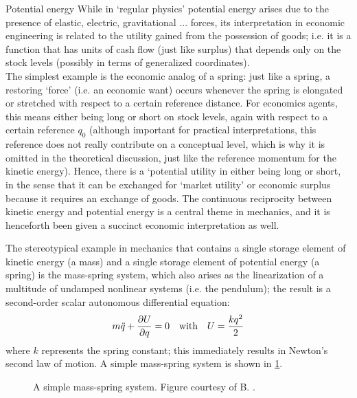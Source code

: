 \begin{econ}{Potential energy}
    While in `regular physics' potential energy arises due to the presence of elastic, electric, gravitational ... forces, its interpretation in economic engineering is related to the utility gained from the possession of goods; i.e. it is a function that has units of cash flow (just like surplus) that depends only on the stock levels (possibly in terms of generalized coordinates).\\

    The simplest example is the economic analog of a spring: just like a spring, a restoring `force' (i.e. an economic want) occurs whenever the spring is elongated or stretched with respect to a certain reference distance. For economics agents, this means either being long or short on stock levels, again with respect to a certain reference $q_0$ (although important for practical interpretations, this reference does not really contribute on a conceptual level, which is why it is omitted in the theoretical discussion, just like the reference momentum for the kinetic energy). Hence, there is a `potential utility in either being long or short, in the sense that it can be exchanged for `market utility' or economic surplus because it requires an exchange of goods. The continuous reciprocity between kinetic energy and 
    potential energy is a central theme in mechanics, and it is henceforth been given a succinct economic interpretation as well.
\end{econ}
The stereotypical example in mechanics that contains a single storage element of kinetic energy (a mass) and a single storage  element of potential energy (a spring) is the mass-spring system, which also arises as the linearization of a multitude of undamped nonlinear systems (i.e. the pendulum); the result is a second-order scalar autonomous differential equation:
\begin{equation}
    m\ddot{q} + \pdv{U}{q} = 0 \quad \text{with} \quad U = \frac{kq^2}{2}
    \label{eq:mass_spring}
\end{equation}
where $k$ represents the spring constant; this immediately results in Newton's second law of motion. A simple mass-spring system is shown in \cref{fig:mass_spring}.
\begin{figure}[ht]
    \centering
    
    \caption{A simple mass-spring system. Figure courtesy of B. \citet{Krabbenborg2021}.}
    \label{fig:mass_spring}
\end{figure}

